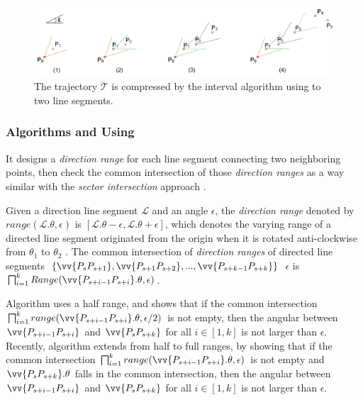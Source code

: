 \begin{figure}[tb!]
	\centering
	\includegraphics[scale=0.66]{Figures/Fig-interval.jpg}
	\vspace{-1ex}
	\caption{\small The trajectory $\dddot{\mathcal{T}}$ is compressed by the interval algorithm using \dad to two line segments.}
	\vspace{-1ex}
	\label{fig:interval}
\end{figure}




\subsubsection{Algorithms \intersec \cite{Long:Direction} and \interval \cite{Ke:Interval} Using \dad}
It designs a \emph{direction range} for each line segment connecting two neighboring points, then check the common intersection of those \emph{direction ranges} as a way similar with the \emph{sector intersection} approach \cite{Williams:Longest, Sklansky:Cone, Dunham:Cone, Zhao:Sleeve}.

Given a direction line segment $\mathcal{L}$ and an angle $\epsilon$, the \emph{direction range} denoted by $range(\mathcal{L}.\theta, \epsilon)$ is $[\mathcal{L}.\theta-\epsilon, \mathcal{L}.\theta+\epsilon]$, which denotes the varying range of a directed line segment originated from the origin when it is rotated anti-clockwise from $\theta_1$ to $\theta_2$  \cite{Long:Direction}.
%
The {common intersection} of \emph{direction ranges} of directed line segments $\{\vv{P_sP_{s+1}}, \vv{P_{s+1}P_{s+2}}, ..., \vv{P_{s+k-1}P_{s+k}}\}$ \wrt $\epsilon$ is $\bigsqcap_{i=1}^{k}Range(\vv{P_{s+i-1} P_{s+i}}.\theta, \epsilon)$.

Algorithm \intersec\cite{Long:Direction} uses a half range, and shows that if the {common intersection} $\bigsqcap_{i=1}^{k}range(\vv{P_{s+i-1} P_{s+i}}.\theta, \epsilon/2)$ is not empty, then the angular between $\vv{P_{s+i-1}P_{s+i}}$ and $\vv{P_sP_{s+k}}$ for all $i\in [1, k]$ is not larger than $\epsilon$.
%
Recently, algorithm \interval \cite{Ke:Interval} extends \intersec from half to full ranges, by showing that if the {common intersection} $\bigsqcap_{i=1}^{k}range(\vv{P_{s+i-1} P_{s+i}}.\theta, \epsilon)$ is not empty and $\vv{P_sP_{s+k}}.\theta$ falls in the {common intersection}, then the angular between $\vv{P_{s+i-1}P_{s+i}}$ and $\vv{P_sP_{s+k}}$ for all $i\in [1, k]$ is not larger than $\epsilon$.


